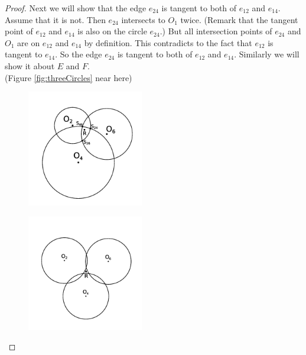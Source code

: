 \documentclass[suppldata, dvipdfmx]{interact}
\theoremstyle{plain}%
\theoremstyle{definition}
\theoremstyle{remark}
\theoremstyle{problemstyle}
\begin{document}
\begin{proof}
Next we will show that the edge $e_{24}$ is tangent to both of $e_{12}$ and
 $e_{14}$. Assume that it is not. Then $e_{24}$ intersects to $O_1$
 twice.
(Remark that the tangent point of $e_{12}$ and $e_{14}$ is also on the
 circle $e_{24}$.) But all intersection points of $e_{24}$ and $O_1$ are
 on $e_{12}$ and $e_{14}$ by definition. This contradicts to the fact
 that $e_{12}$ is tangent to $e_{14}$. So the edge $e_{24}$ is tangent
 to both of $e_{12}$ and $e_{14}$. Similarly we will show it about $E$
 and $F$.
\\
\noindent(Figure \ref{fig:threeCircles}
 near here)

\begin{figure}[h!tbp]
  \begin{minipage}[t]{0.3\textwidth}
   \centering
   \includegraphics[width=2in, keepaspectratio]{./img/HexahedraWithSphericalFaces/threeCircles1.jpg}
   \subcaption{}
   \label{fig:condition1}
  \end{minipage}
 \hspace*{\fill}
  \begin{minipage}[t]{0.3\textwidth}
   \centering
   \includegraphics[width=2in, keepaspectratio]{./img/HexahedraWithSphericalFaces/threeCircles2.jpg}
   \subcaption{}
   \label{fig:condition2}
  \end{minipage}
  \hspace*{\fill}
  \begin{minipage}[t]{0.3\textwidth}
   \centering

\end{minipage}
\end{figure}
\end{proof}
\end{document}
